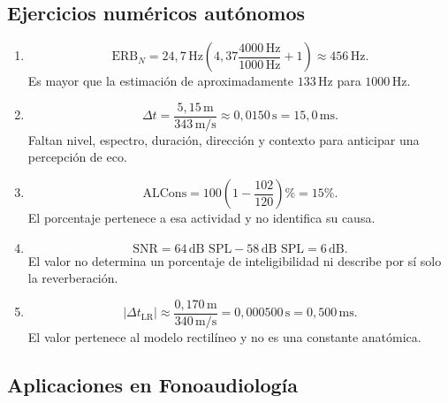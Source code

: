 \subsection*{Ejercicios numéricos autónomos}

\begin{enumerate}[label=\textbf{N\arabic*.},leftmargin=*]
    \item
    \[
        \mathrm{ERB}_{N}
          =24{,}7\,\text{Hz}
           \left(4{,}37\frac{4000\,\text{Hz}}
                              {1000\,\text{Hz}}+1\right)
          \approx456\,\text{Hz}.
    \]
    Es mayor que la estimación de aproximadamente \(133\,\text{Hz}\) para
    \(1000\,\text{Hz}\).

    \item
    \[
        \Delta t
          =\frac{5{,}15\,\text{m}}{343\,\text{m}/\text{s}}
          \approx0{,}0150\,\text{s}
          =15{,}0\,\text{ms}.
    \]
    Faltan nivel, espectro, duración, dirección y contexto para anticipar una
    percepción de eco.

    \item
    \[
        \mathrm{ALCons}
          =100\left(1-\frac{102}{120}\right)\%
          =15\%.
    \]
    El porcentaje pertenece a esa actividad y no identifica su causa.

    \item
    \[
        \mathrm{SNR}
          =64\,\text{dB SPL}-58\,\text{dB SPL}
          =6\,\text{dB}.
    \]
    El valor no determina un porcentaje de inteligibilidad ni describe por sí
    solo la reverberación.

    \item
    \[
        \lvert\Delta t_\mathrm{LR}\rvert
          \approx\frac{0{,}170\,\text{m}}{340\,\text{m}/\text{s}}
          =0{,}000500\,\text{s}
          =0{,}500\,\text{ms}.
    \]
    El valor pertenece al modelo rectilíneo y no es una constante anatómica.
\end{enumerate}

\subsection*{Aplicaciones en Fonoaudiología}

